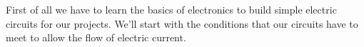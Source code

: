 \documentclass[../sparc.tex]{subfiles}
\begin{document}
First of all we have to learn the basics of electronics to build simple electric
circuits for our projects.  We'll start with the conditions that our circuits
have to meet to allow the flow of electric current.
\end{document}

